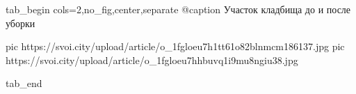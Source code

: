  
 
 
 
 


\ifcmt
  tab_begin cols=2,no_fig,center,separate
		 @caption Участок кладбища до и после уборки

     pic https://svoi.city/upload/article/o_1fgloeu7h1tt61o82blnmcm186137.jpg
		 pic https://svoi.city/upload/article/o_1fgloeu7hhbuvq1i9mu8ngiu38.jpg

  tab_end
\fi
